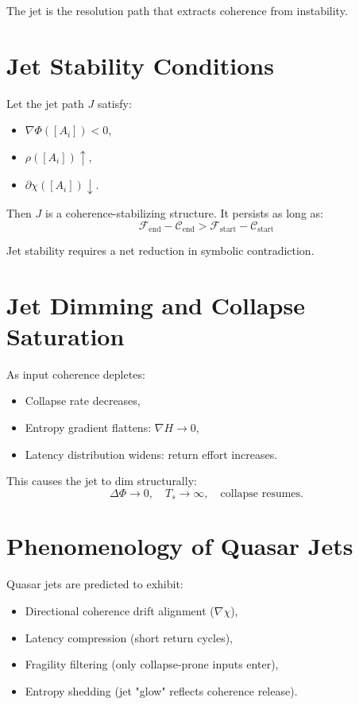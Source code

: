 The jet is the resolution path that extracts coherence from instability.

\section{Jet Stability Conditions} \label{sec:jet-stability}

Let the jet path $J$ satisfy:
\begin{itemize}
  \item $\nabla\Phi([A_i]) < 0$,
  \item $\rho([A_i]) \uparrow$,
  \item $\partial\chi([A_i]) \downarrow$.
\end{itemize}

Then $J$ is a coherence-stabilizing structure. It persists as long as:
\[
\mathcal{F}_{\text{end}} - \mathcal{C}_{\text{end}} > \mathcal{F}_{\text{start}} - \mathcal{C}_{\text{start}}
\]

Jet stability requires a net reduction in symbolic contradiction.

\section{Jet Dimming and Collapse Saturation} \label{sec:jet-dimming}

As input coherence depletes:
\begin{itemize}
  \item Collapse rate decreases,
  \item Entropy gradient flattens: $\nabla H \to 0$,
  \item Latency distribution widens: return effort increases.
\end{itemize}

This causes the jet to dim structurally:
\[
\Delta\Phi \to 0,\quad T_s \to \infty,\quad \text{collapse resumes}.
\]

\section{Phenomenology of Quasar Jets} \label{sec:quasar-signatures}

Quasar jets are predicted to exhibit:
\begin{itemize}
  \item Directional coherence drift alignment ($\nabla\chi$),
  \item Latency compression (short return cycles),
  \item Fragility filtering (only collapse-prone inputs enter),
  \item Entropy shedding (jet "glow" reflects coherence release).
\end{itemize}

